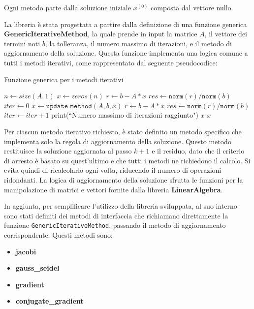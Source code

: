 Ogni metodo parte dalla soluzione iniziale $x^{(0)}$ composta dal vettore nullo.

La libreria è stata progettata a partire dalla definizione di una funzione generica
\textbf{GenericIterativeMethod}, la quale prende in input la matrice $A$, il
vettore dei termini noti $b$, la tolleranza, il numero massimo di iterazioni, e
il metodo di aggiornamento della soluzione. Questa funzione implementa una logica
comune a tutti i metodi iterativi, come rappresentato dal seguente pseudocodice:
\begin{algorithm}
    \caption{Funzione generica per i metodi iterativi}\label{alg:iterative}
    \begin{algorithmic}
        \State $n \gets size(A, 1)$
        \State $x \gets zeros(n)$
        \State $r \gets b - A * x$
        \State $res \gets \texttt{norm}(r) / \texttt{norm}(b)$
        \State $iter \gets 0$
        \State $x \gets \texttt{update\_method}(A, b, x)$
        \State $r \gets b - A * x$
        \State $res \gets \texttt{norm}(r) / \texttt{norm}(b)$
        \State $iter \gets iter + 1$
        \State print(``Numero massimo di iterazioni raggiunto")
        \State \Return $x$
        \EndIf
        \EndWhile
        \State \Return $x$
        \EndFunction
    \end{algorithmic}
\end{algorithm}

Per ciascun metodo iterativo richiesto, è stato definito un metodo specifico che
implementa solo la regola di aggiornamento della soluzione. Questo metodo restituisce
la soluzione aggiornata al passo $k+1$ e il residuo, dato che il criterio di
arresto è basato su quest'ultimo e che tutti i metodi ne richiedono il calcolo.
Si evita quindi di ricalcolarlo ogni volta, riducendo il numero di operazioni
ridondanti. La logica di aggiornamento della soluzione sfrutta le funzioni per
la manipolazione di matrici e vettori fornite dalla libreria \textbf{LinearAlgebra}.

In aggiunta, per semplificare l'utilizzo della libreria sviluppata, al suo interno
sono stati definiti dei metodi di interfaccia che richiamano direttamente la
funzione \texttt{GenericIterativeMethod}, passando il metodo di aggiornamento
corrispondente. Questi metodi sono:
\begin{itemize}
    \item \textbf{jacobi}
    \item \textbf{gauss\_seidel}
    \item \textbf{gradient}
    \item \textbf{conjugate\_gradient}
\end{itemize}

